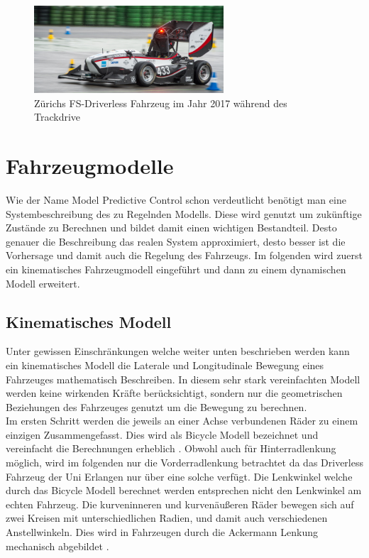 \documentclass{like}
\begin{document}
\begin{figure}[hb!]
	\caption{Zürichs FS-Driverless Fahrzeug im Jahr 2017 während des Trackdrive}
	\includegraphics[width=200pt]{Abbildungen/amz-driverless-long.jpg}
\end{figure}


\chapter{Fahrzeugmodelle}


Wie der Name Model Predictive Control schon verdeutlicht benötigt man eine Systembeschreibung des zu Regelnden Modells. Diese wird genutzt um zukünftige Zustände zu Berechnen und bildet damit einen wichtigen Bestandteil. Desto genauer die Beschreibung das realen System approximiert, desto besser ist die Vorhersage und damit auch die Regelung des Fahrzeugs.
Im folgenden wird zuerst ein kinematisches Fahrzeugmodell eingeführt und dann zu einem dynamischen Modell erweitert.   

\section{Kinematisches Modell}
Unter gewissen Einschränkungen welche weiter unten beschrieben werden kann ein kinematisches Modell die Laterale und Longitudinale Bewegung eines Fahrzeuges mathematisch Beschreiben. In diesem sehr stark vereinfachten Modell werden keine wirkenden Kräfte berücksichtigt, sondern nur die geometrischen Beziehungen des Fahrzeuges genutzt um die Bewegung zu berechnen. \\
Im ersten Schritt werden die jeweils an einer Achse verbundenen Räder zu einem einzigen Zusammengefasst. Dies wird als Bicycle Modell bezeichnet und vereinfacht die Berechnungen erheblich \cite{BicycleModel}. Obwohl auch für Hinterradlenkung möglich, wird im folgenden nur die Vorderradlenkung betrachtet da das Driverless Fahrzeug der Uni Erlangen nur über eine solche verfügt. Die Lenkwinkel welche durch das Bicycle Modell berechnet werden entsprechen nicht den Lenkwinkel am echten Fahrzeug. Die kurveninneren und kurvenäußeren Räder bewegen sich auf zwei Kreisen mit unterschiedlichen Radien, und damit auch verschiedenen Anstellwinkeln. Dies wird in Fahrzeugen durch die Ackermann Lenkung mechanisch abgebildet \cite{rajamani2011vehicle}.
\end{document}
